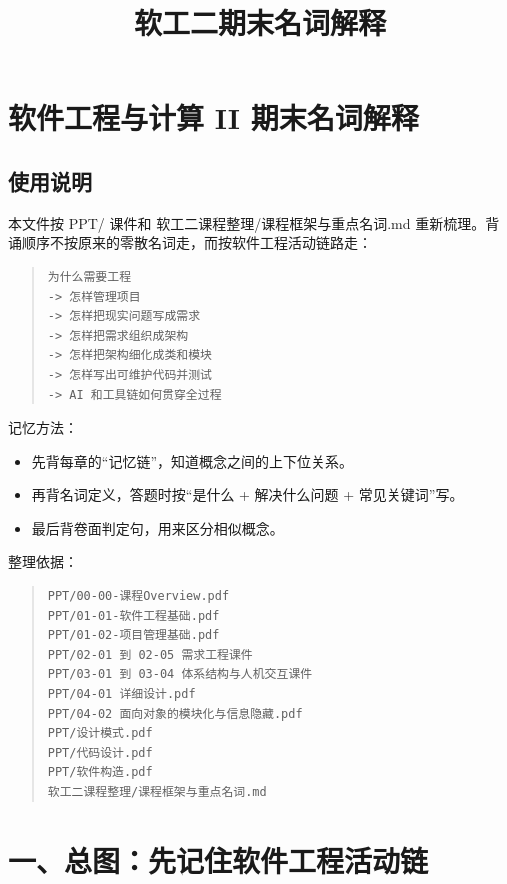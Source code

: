 \documentclass[UTF8,zihao=-4]{ctexart}
\title{软工二期末名词解释}
\author{}
\date{}
\begin{document}
\maketitle
\setcounter{tocdepth}{1}
\tableofcontents
\newpage

\section{软件工程与计算 II 期末名词解释}


\subsection{使用说明}


本文件按 PPT/ 课件和 软工二课程整理/课程框架与重点名词.md 重新梳理。背诵顺序不按原来的零散名词走，而按软件工程活动链路走：


\begin{quote}
\footnotesize
\begin{verbatim}
为什么需要工程
-> 怎样管理项目
-> 怎样把现实问题写成需求
-> 怎样把需求组织成架构
-> 怎样把架构细化成类和模块
-> 怎样写出可维护代码并测试
-> AI 和工具链如何贯穿全过程
\end{verbatim}
\end{quote}


记忆方法：


\begin{itemize}
\item 先背每章的“记忆链”，知道概念之间的上下位关系。
\item 再背名词定义，答题时按“是什么 + 解决什么问题 + 常见关键词”写。
\item 最后背卷面判定句，用来区分相似概念。
\end{itemize}

整理依据：


\begin{quote}
\footnotesize
\begin{verbatim}
PPT/00-00-课程Overview.pdf
PPT/01-01-软件工程基础.pdf
PPT/01-02-项目管理基础.pdf
PPT/02-01 到 02-05 需求工程课件
PPT/03-01 到 03-04 体系结构与人机交互课件
PPT/04-01 详细设计.pdf
PPT/04-02 面向对象的模块化与信息隐藏.pdf
PPT/设计模式.pdf
PPT/代码设计.pdf
PPT/软件构造.pdf
软工二课程整理/课程框架与重点名词.md
\end{verbatim}
\end{quote}


\section{一、总图：先记住软件工程活动链}
\end{document}
